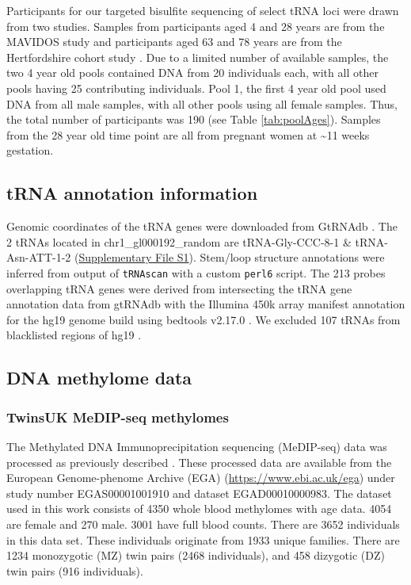 \documentclass[
]{book}
\begin{document}
Participants for our targeted bisulfite sequencing of select tRNA loci were drawn from two studies.
Samples from participants aged 4 and 28 years are from the MAVIDOS \citep{Harvey2012a} study and participants aged 63 and 78 years are from the Hertfordshire cohort study \citep{Syddall2005}.
Due to a limited number of available samples, the two 4 year old pools contained DNA from 20 individuals each, with all other pools having 25 contributing individuals.
Pool 1, the first 4 year old pool used DNA from all male samples, with all other pools using all female samples.
Thus, the total number of participants was 190 (see Table \ref{tab:poolAges}).
Samples from the 28 year old time point are all from pregnant women at \textasciitilde11 weeks gestation.

\hypertarget{tRNAanno}{%
\subsection{tRNA annotation information}\label{tRNAanno}}

Genomic coordinates of the tRNA genes were downloaded from GtRNAdb \citep{Chan2009}.
The 2 tRNAs located in chr1\_gl000192\_random are tRNA-Gly-CCC-8-1 \& tRNA-Asn-ATT-1-2 (\href{./Supplementary_Files/hg19-tRNAs.bed}{Supplementary File S1}).
Stem/loop structure annotations were inferred from output of \texttt{tRNAscan} \citep{Lowe2016} with a custom \texttt{perl6} script.
The 213 probes overlapping tRNA genes were derived from intersecting the tRNA gene annotation data from gtRNAdb with the Illumina 450k array manifest annotation for the hg19 genome build using bedtools v2.17.0 \citep{Quinlan2010}.
We excluded 107 tRNAs from blacklisted regions of hg19 \citep{Amemiya2019}.

\hypertarget{dna-methylome-data}{%
\subsection{DNA methylome data}\label{dna-methylome-data}}

\hypertarget{EpiTwinsMethods}{%
\subsubsection{TwinsUK MeDIP-seq methylomes}\label{EpiTwinsMethods}}

The Methylated DNA Immunoprecipitation sequencing (MeDIP-seq) data was processed as previously described \citep{Bell2016, Bell2017a}.
These processed data are available from the European Genome-phenome Archive (EGA) (\url{https://www.ebi.ac.uk/ega}) under study number EGAS00001001910 and dataset EGAD00010000983.
The dataset used in this work consists of 4350 whole blood methylomes with age data.
4054 are female and 270 male.
3001 have full blood counts.
There are 3652 individuals in this data set.
These individuals originate from 1933 unique families.
There are 1234 monozygotic (MZ) twin pairs (2468 individuals), and 458 dizygotic (DZ) twin pairs (916 individuals).
\end{document}
